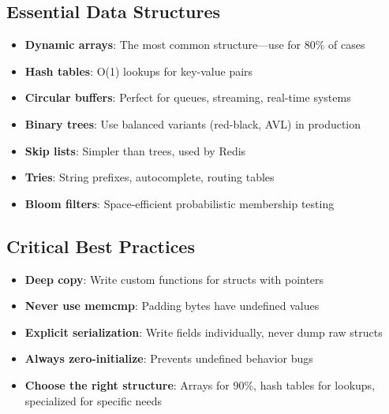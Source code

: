 \subsection{Essential Data Structures}

\begin{itemize}
    \item \textbf{Dynamic arrays}: The most common structure—use for 80\% of cases
    \item \textbf{Hash tables}: O(1) lookups for key-value pairs
    \item \textbf{Circular buffers}: Perfect for queues, streaming, real-time systems
    \item \textbf{Binary trees}: Use balanced variants (red-black, AVL) in production
    \item \textbf{Skip lists}: Simpler than trees, used by Redis
    \item \textbf{Tries}: String prefixes, autocomplete, routing tables
    \item \textbf{Bloom filters}: Space-efficient probabilistic membership testing
\end{itemize}

\subsection{Critical Best Practices}

\begin{itemize}
    \item \textbf{Deep copy}: Write custom functions for structs with pointers
    \item \textbf{Never use memcmp}: Padding bytes have undefined values
    \item \textbf{Explicit serialization}: Write fields individually, never dump raw structs
    \item \textbf{Always zero-initialize}: Prevents undefined behavior bugs
    \item \textbf{Choose the right structure}: Arrays for 90\%, hash tables for lookups, specialized for specific needs
\end{itemize}

